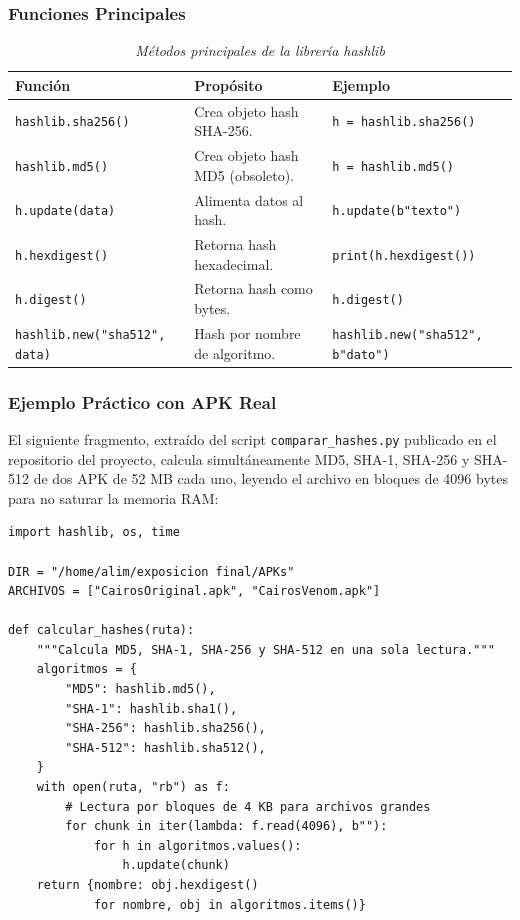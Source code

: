 \documentclass[12pt,a4paper]{article}
\begin{document}
\subsubsection{Funciones Principales}

\begin{table}[H]
\centering
\begin{threeparttable}
\caption{\textit{Métodos principales de la librería hashlib}}
\begin{tabular}{p{3.5cm}p{5cm}p{4.5cm}}
\toprule
\textbf{Función} & \textbf{Propósito} & \textbf{Ejemplo} \\
\midrule
\texttt{hashlib.sha256()} & Crea objeto hash SHA-256. & \texttt{h = hashlib.sha256()} \\
\texttt{hashlib.md5()} & Crea objeto hash MD5 (obsoleto). & \texttt{h = hashlib.md5()} \\
\texttt{h.update(data)} & Alimenta datos al hash. & \texttt{h.update(b"texto")} \\
\texttt{h.hexdigest()} & Retorna hash hexadecimal. & \texttt{print(h.hexdigest())} \\
\texttt{h.digest()} & Retorna hash como bytes. & \texttt{h.digest()} \\
\texttt{hashlib.new("sha512", data)} & Hash por nombre de algoritmo. & \texttt{hashlib.new("sha512", b"dato")} \\
\bottomrule
\end{tabular}
\end{threeparttable}
\end{table}

\subsubsection{Ejemplo Práctico con APK Real}

El siguiente fragmento, extraído del script \texttt{comparar\_hashes.py}
publicado en el repositorio del proyecto, calcula simultáneamente
MD5, SHA-1, SHA-256 y SHA-512 de dos APK de 52 MB cada uno, leyendo
el archivo en bloques de 4096 bytes para no saturar la memoria RAM:

\begin{lstlisting}[caption={Cálculo simultáneo de cuatro hashes sobre APK de 52 MB},
                   label=lst:hashlib_apk]
import hashlib, os, time

DIR = "/home/alim/exposicion final/APKs"
ARCHIVOS = ["CairosOriginal.apk", "CairosVenom.apk"]

def calcular_hashes(ruta):
    """Calcula MD5, SHA-1, SHA-256 y SHA-512 en una sola lectura."""
    algoritmos = {
        "MD5": hashlib.md5(),
        "SHA-1": hashlib.sha1(),
        "SHA-256": hashlib.sha256(),
        "SHA-512": hashlib.sha512(),
    }
    with open(ruta, "rb") as f:
        # Lectura por bloques de 4 KB para archivos grandes
        for chunk in iter(lambda: f.read(4096), b""):
            for h in algoritmos.values():
                h.update(chunk)
    return {nombre: obj.hexdigest()
            for nombre, obj in algoritmos.items()}
\end{lstlisting}
\end{document}
